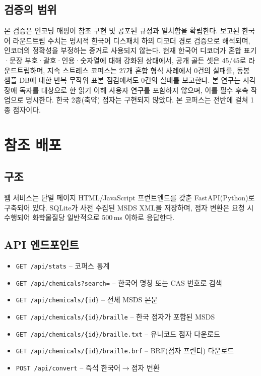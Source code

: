 \documentclass[journal]{IEEEtran}
\begin{document}
\subsection{검증의 범위}

본 검증은 인코딩 매핑이 참조 구현 및 공포된 규정과 일치함을 확립한다. 보고된 한국어 라운드트립 수치는 명시적 한국어 디스패치 하의 디코더 경로 검증으로 해석되며, 인코더의 정확성을 부정하는 증거로 사용되지 않는다. 현재 한국어 디코더가 혼합 표기·문장 부호·괄호·인용·숫자열에 대해 강화된 상태에서, 공개 골든 셋은 45/45로 라운드트립하며, 지속 스트레스 코퍼스는 27개 혼합 형식 사례에서 0건의 실패를, 동봉 샘플 DB에 대한 반복 무작위 표본 점검에서도 0건의 실패를 보고한다. 본 연구는 시각장애 독자를 대상으로 한 읽기 이해 사용자 연구를 포함하지 않으며, 이를 필수 후속 작업으로 명시한다. 한국 2종(축약) 점자는 구현되지 않았다. 본 코퍼스는 전반에 걸쳐 1종 점자이다.

\section{참조 배포}
\label{sec:webservice}

\subsection{구조}

웹 서비스는 단일 페이지 HTML/JavaScript 프런트엔드를 갖춘 FastAPI(Python)로 구축되어 있다. SQLite가 사전 수집된 MSDS XML을 저장하며, 점자 변환은 요청 시 수행되어 화학물질당 일반적으로 500\,ms 이하로 응답한다.

\subsection{API 엔드포인트}

\begin{itemize}
\item \texttt{GET /api/stats} -- 코퍼스 통계
\item \texttt{GET /api/chemicals?search=} -- 한국어 명칭 또는 CAS 번호로 검색
\item \texttt{GET /api/chemicals/\{id\}} -- 전체 MSDS 본문
\item \texttt{GET /api/chemicals/\{id\}/braille} -- 한국 점자가 포함된 MSDS
\item \texttt{GET /api/chemicals/\{id\}/braille.txt} -- 유니코드 점자 다운로드
\item \texttt{GET /api/chemicals/\{id\}/braille.brf} -- BRF(점자 프린터) 다운로드
\item \texttt{POST /api/convert} -- 즉석 한국어$\rightarrow$점자 변환
\end{itemize}
\end{document}
